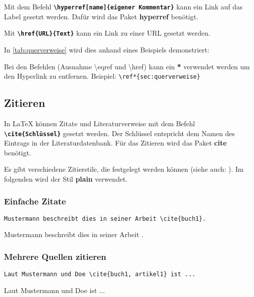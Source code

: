 Mit dem Befehl \textbf{\texttt{\textbackslash hyperref[name]\{eigener Kommentar\}}} kann ein Link auf das Label gesetzt werden. Dafür wird das Paket \textbf{hyperref} benötigt.

Mit \textbf{\texttt{\textbackslash href\{URL\}\{Text\}}} kann ein Link zu einer URL gesetzt werden.

In \autoref{tab:querverweise} wird dies anhand eines Beispiels demonstriert:


Bei den Befehlen (Ausnahme \textbackslash eqref und \textbackslash href) kann ein \textbf{*} verwendet werden um den Hyperlink zu entfernen. Beispiel: \texttt{\textbackslash ref*\{sec:querverweise\}}


\subsection{Zitieren}
\label{sec:zitieren}
In \LaTeX{} können Zitate und Literaturverweise mit dem Befehl \textbf{\texttt{\textbackslash cite\{Schlüssel\}}} gesetzt werden. Der Schlüssel entspricht dem Namen des Eintrags in der Literaturdatenbank.
Für das Zitieren wird das Paket \textbf{cite} benötigt.

Es gibt verschiedene Zitierstile, die festgelegt werden können (siehe auch: ). Im folgenden wird der Stil \textbf{plain} verwendet.

\subsubsection{Einfache Zitate}

\begin{minipage}[c]{0.48\textwidth}
    \begin{lstlisting}[language={[LaTeX]TeX}]
Mustermann beschreibt dies in seiner Arbeit \cite{buch1}.
    \end{lstlisting}
\end{minipage}
\hfill
\begin{minipage}[c]{0.48\textwidth}
    Mustermann beschreibt dies in seiner Arbeit \cite{buch1}.
\end{minipage}


\subsubsection{Mehrere Quellen zitieren}

\begin{minipage}[c]{0.48\textwidth}
    \begin{lstlisting}[language={[LaTeX]TeX}]
Laut Mustermann und Doe \cite{buch1, artikel1} ist ...
    \end{lstlisting}
\end{minipage}
\hfill
\begin{minipage}[c]{0.48\textwidth}
    Laut Mustermann und Doe \cite{buch1, artikel1} ist ...
\end{minipage}


